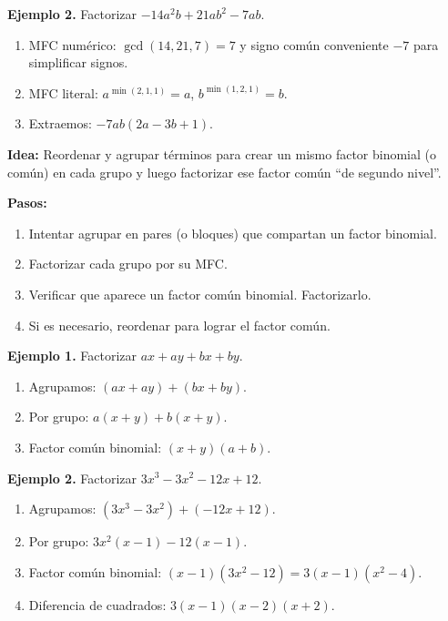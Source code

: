 \begin{example}
\textbf{Ejemplo 2.} Factorizar $-14a^2b + 21ab^2 - 7ab$.

\begin{enumerate}
  \item MFC numérico: $\gcd(14,21,7)=7$ y signo común conveniente $-7$ para simplificar signos.
  \item MFC literal: $a^{\min(2,1,1)}=a$, $b^{\min(1,2,1)}=b$.
  \item Extraemos: $-7ab(2a - 3b + 1)$.
\end{enumerate}
\end{example}


\textbf{Idea:} Reordenar y agrupar términos para crear un mismo factor binomial (o común) en cada grupo y luego factorizar ese factor común “de segundo nivel”.

\textbf{Pasos:}
\begin{enumerate}
  \item Intentar agrupar en pares (o bloques) que compartan un factor binomial.
  \item Factorizar cada grupo por su MFC.
  \item Verificar que aparece un factor común binomial. Factorizarlo.
  \item Si es necesario, reordenar para lograr el factor común.
\end{enumerate}

\begin{example}
\textbf{Ejemplo 1.} Factorizar $ax + ay + bx + by$.
\begin{enumerate}
  \item Agrupamos: $(ax + ay) + (bx + by)$.
  \item Por grupo: $a(x + y) + b(x + y)$.
  \item Factor común binomial: $(x + y)(a + b)$.
\end{enumerate}
\end{example}

\begin{example}
\textbf{Ejemplo 2.} Factorizar $3x^3 - 3x^2 - 12x + 12$.
\begin{enumerate}
  \item Agrupamos: $(3x^3 - 3x^2) + (-12x + 12)$.
  \item Por grupo: $3x^2(x - 1) - 12(x - 1)$.
  \item Factor común binomial: $(x - 1)(3x^2 - 12) = 3(x - 1)(x^2 - 4)$.
  \item Diferencia de cuadrados: $3(x - 1)(x - 2)(x + 2)$.
\end{enumerate}
\end{example}

